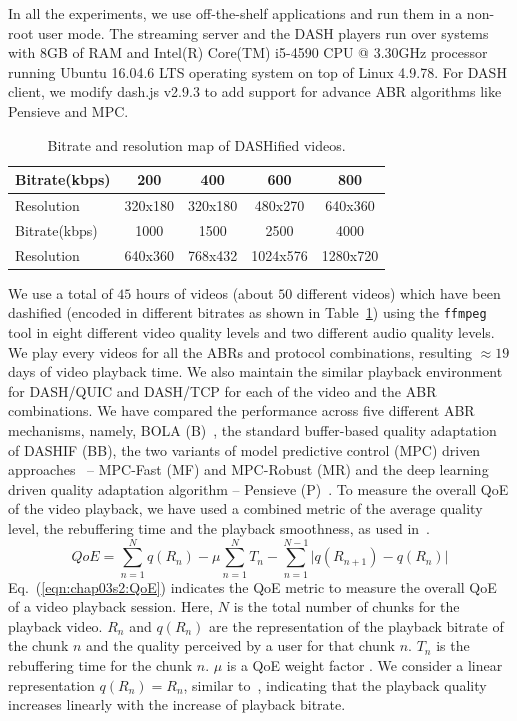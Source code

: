 In all the experiments, we use off-the-shelf applications and run them in a non-root user mode. The streaming server and the DASH players run over systems with 8GB of RAM and Intel(R) Core(TM) i5-4590 CPU @ 3.30GHz processor running Ubuntu 16.04.6 LTS operating system on top of Linux 4.9.78. For DASH client, we modify dash.js v2.9.3 to add support for advance ABR algorithms like Pensieve and MPC.


\begin{table}[h]
     \caption{\label{table:chap03s2:bitrate}Bitrate and resolution map of DASHified videos.}
	\centering
	\begin{tabular}{|l|c|c|c|c|}
		\hline
		Bitrate(kbps) & 200 & 400 & 600 & 800 \\ \hline
		Resolution & 320x180 & 320x180 & 480x270 & 640x360 \\ \hline \hline
		Bitrate(kbps) & 1000 & 1500 & 2500 & 4000 \\ \hline
		Resolution & 640x360 & 768x432 & 1024x576 & 1280x720 \\ \hline
	\end{tabular}
\end{table}

We use a total of $45$ hours of videos (about $50$ different videos) which have been dashified (encoded in different bitrates as shown in Table~\ref{table:chap03s2:bitrate}) using the {\tt ffmpeg} tool in eight different video quality levels and two different audio quality levels. We play every videos for all the ABRs and protocol combinations, resulting $\approx 19$ days of video playback time. We also maintain the similar playback environment for DASH/QUIC and DASH/TCP for each of the video and the ABR combinations. 
We have compared the performance across five different ABR mechanisms, namely, BOLA (B)~\cite{Spiteri2016}, the standard buffer-based quality adaptation of DASHIF (BB), the two variants of model predictive control (MPC) driven approaches~\cite{yin2015control} -- MPC-Fast (MF) and MPC-Robust (MR) and the deep learning driven quality adaptation algorithm -- Pensieve (P)~\cite{mao2017neural}. To measure the overall QoE of the video playback, we have used a combined metric of the average quality level, the rebuffering time and the playback smoothness, as used in~\cite{yin2015control,mao2017neural}.
\begin{equation}
QoE=\sum_{n=1}^{N}q(R_n)-\mu\sum_{n=1}^{N}T_n-\sum_{n=1}^{N-1} \bigg\vert q(R_{n+1})-q(R_n)  \bigg\vert
\label{eqn:chap03s2:QoE}
\end{equation}
Eq.~(\ref{eqn:chap03s2:QoE}) indicates the QoE metric to measure the overall QoE of a video playback session. Here, $N$ is the total number of chunks for the playback video. $R_n$ and $q(R_n)$ are the representation of the playback bitrate of the chunk $n$ and the quality perceived by a user for that chunk $n$. $T_n$ is the rebuffering time for the chunk $n$. $\mu$ is a QoE weight factor \cite{yin2015control}.
We consider a linear representation $q(R_n) = R_n$, similar to~\cite{yin2015control}, indicating that the playback quality increases linearly with the increase of playback bitrate.
